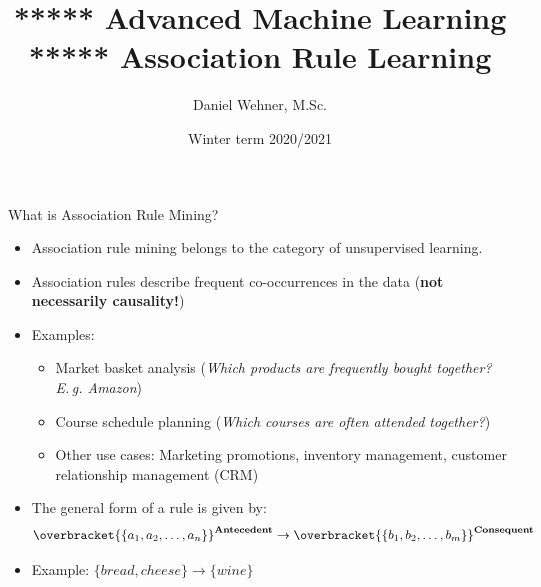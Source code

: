 




\title[Association Rule Learning]{***** Advanced Machine Learning ***** Association Rule Learning}
\author{Daniel Wehner, M.Sc.}
\date{Winter term 2020/2021}




\dwPrintTitle

\dwPrintToc


\begin{dwHeaderFrame}{What is Association Rule Mining?}
	\begin{itemize}
		\item Association rule mining belongs to the category of unsupervised learning.
		\item Association rules describe frequent co-occurrences in the data (\textbf{not necessarily causality!})
		\item Examples:
		\begin{itemize}
			\item Market basket analysis (\textit{Which products are frequently bought together? E.\,g. Amazon})
			\item Course schedule planning (\textit{Which courses are often attended together?})
			\item Other use cases: Marketing promotions, inventory management, customer relationship management (CRM) 
		\end{itemize}
		\item The general form of a rule is given by:
		\begin{equation}
			\overbracket{\{a_1, a_2, \dots, a_n\}}^{\text{\textbf{Antecedent}}} 
			\rightarrow 
			\overbracket{\{b_1, b_2, \dots, b_m\}}^{\text{\textbf{Consequent}}}
		\end{equation}
		\item Example: $\{ bread, cheese \} \rightarrow \{ wine \}$
	\end{itemize}
\end{dwHeaderFrame}


